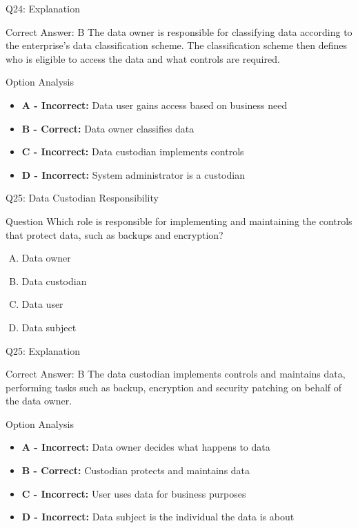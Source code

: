 \documentclass{beamer}
\begin{document}
	\begin{frame}{Q24: Explanation}
		\begin{block}{Correct Answer: B}
			The data owner is responsible for classifying data according to the enterprise's data classification scheme. The classification scheme then defines who is eligible to access the data and what controls are required.
		\end{block}
		\begin{block}{Option Analysis}
			\begin{itemize}
				\item \textbf{A - Incorrect:} Data user gains access based on business need
				\item \textbf{B - Correct:} Data owner classifies data
				\item \textbf{C - Incorrect:} Data custodian implements controls
				\item \textbf{D - Incorrect:} System administrator is a custodian
			\end{itemize}
		\end{block}
	\end{frame}
	
	\begin{frame}{Q25: Data Custodian Responsibility}
		\begin{block}{Question}
			Which role is responsible for implementing and maintaining the controls that protect data, such as backups and encryption?
		\end{block}
		\begin{enumerate}[(A)]
			\item Data owner
			\item Data custodian
			\item Data user
			\item Data subject
		\end{enumerate}
	\end{frame}
	
	\begin{frame}{Q25: Explanation}
		\begin{block}{Correct Answer: B}
			The data custodian implements controls and maintains data, performing tasks such as backup, encryption and security patching on behalf of the data owner.
		\end{block}
		\begin{block}{Option Analysis}
			\begin{itemize}
				\item \textbf{A - Incorrect:} Data owner decides what happens to data
				\item \textbf{B - Correct:} Custodian protects and maintains data
				\item \textbf{C - Incorrect:} User uses data for business purposes
				\item \textbf{D - Incorrect:} Data subject is the individual the data is about
			\end{itemize}
		\end{block}
	\end{frame}
	
\end{document}
